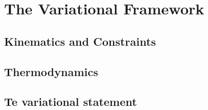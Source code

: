 \section{The Variational Framework}

\sectioncover

\subsection{Kinematics and Constraints}

\begin{frame}
\end{frame}

\subsection{Thermodynamics}

\begin{frame}
\end{frame}

\subsection{Te variational statement}

\begin{frame}
\end{frame}
